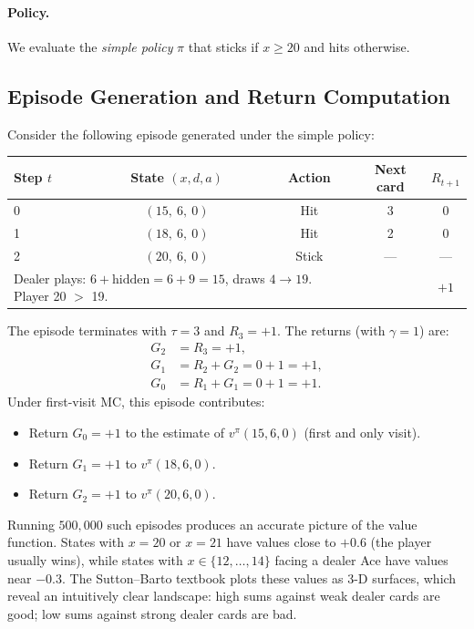 \paragraph{Policy.}  We evaluate the \emph{simple policy} $\pi$ that sticks if $x \ge 20$ and hits otherwise.

\subsection*{Episode Generation and Return Computation}

\begin{example}
\label{ex:blackjack-episode}
Consider the following episode generated under the simple policy:
\begin{center}
\begin{tabular}{@{}lcccc@{}}
\toprule
Step $t$ & State $(x, d, a)$ & Action & Next card & $R_{t+1}$ \\
\midrule
0 & $(15,\ 6,\ 0)$ & Hit  & 3  & 0 \\
1 & $(18,\ 6,\ 0)$ & Hit  & 2  & 0 \\
2 & $(20,\ 6,\ 0)$ & Stick & ---  & --- \\
\multicolumn{3}{l}{Dealer plays: $6 + \text{hidden} = 6+9=15$, draws $4 \to 19$. Player 20 $>$ 19.} & & $+1$ \\
\bottomrule
\end{tabular}
\end{center}
The episode terminates with $\tau = 3$ and $R_3 = +1$.  The returns (with $\gamma=1$) are:
\begin{align*}
  G_2 &= R_3 = +1, \\
  G_1 &= R_2 + G_2 = 0 + 1 = +1, \\
  G_0 &= R_1 + G_1 = 0 + 1 = +1.
\end{align*}
Under first-visit MC, this episode contributes:
\begin{itemize}[leftmargin=*]
  \item Return $G_0 = +1$ to the estimate of $v^\pi(15, 6, 0)$ (first and only visit).
  \item Return $G_1 = +1$ to $v^\pi(18, 6, 0)$.
  \item Return $G_2 = +1$ to $v^\pi(20, 6, 0)$.
\end{itemize}
\end{example}

Running $500{,}000$ such episodes produces an accurate picture of the value function.  States with $x = 20$ or $x = 21$ have values close to $+0.6$ (the player usually wins), while states with $x \in \{12, \dots, 14\}$ facing a dealer Ace have values near $-0.3$.  The Sutton--Barto textbook plots these values as 3-D surfaces, which reveal an intuitively clear landscape: high sums against weak dealer cards are good; low sums against strong dealer cards are bad.

